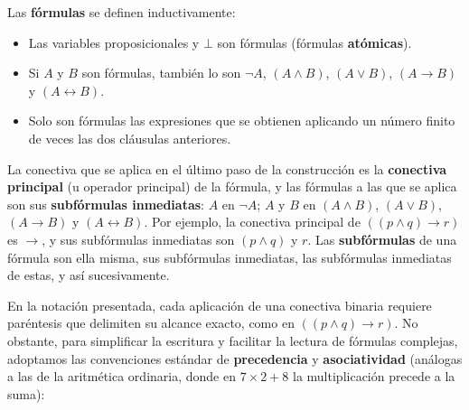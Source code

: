 Las \textbf{fórmulas} se definen inductivamente:
\begin{itemize}
    \item Las variables proposicionales y $\bot$ son fórmulas (fórmulas \textbf{atómicas}).
    \item Si $A$ y $B$ son fórmulas, también lo son $\neg A$, $(A \land B)$, $(A \lor B)$, $(A \to B)$ y $(A \leftrightarrow B)$.
    \item Solo son fórmulas las expresiones que se obtienen aplicando un número finito de veces las dos cláusulas anteriores.
\end{itemize}
La conectiva que se aplica en el último paso de la construcción es la \textbf{conectiva principal} (u operador principal) de la fórmula, y las fórmulas a las que se aplica son sus \textbf{subfórmulas inmediatas}: $A$ en $\neg A$; $A$ y $B$ en $(A \land B)$, $(A \lor B)$, $(A \to B)$ y $(A \leftrightarrow B)$. Por ejemplo, la conectiva principal de $((p \land q) \to r)$ es $\to$, y sus subfórmulas inmediatas son $(p \land q)$ y $r$. Las \textbf{subfórmulas} de una fórmula son ella misma, sus subfórmulas inmediatas, las subfórmulas inmediatas de estas, y así sucesivamente.

En la notación presentada, cada aplicación de una conectiva binaria requiere paréntesis que delimiten su alcance exacto, como en $((p \land q) \to r)$. No obstante, para simplificar la escritura y facilitar la lectura de fórmulas complejas, adoptamos las convenciones estándar de \textbf{precedencia} y \textbf{asociatividad} (análogas a las de la aritmética ordinaria, donde en $7 \times 2 + 8$ la multiplicación precede a la suma):

